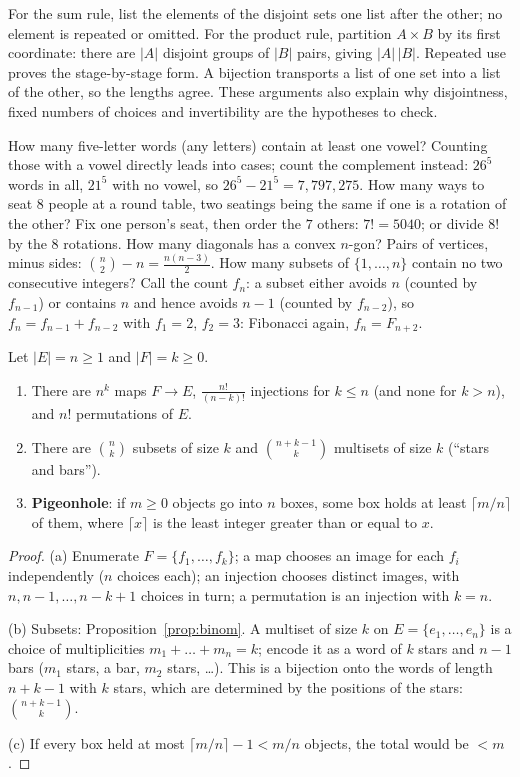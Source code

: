 For the sum rule, list the elements of the disjoint sets one list after the other; no element is repeated or omitted. For the product rule, partition $A\times B$ by its first coordinate: there are $|A|$ disjoint groups of $|B|$ pairs, giving $|A|\,|B|$. Repeated use proves the stage-by-stage form. A bijection transports a list of one set into a list of the other, so the lengths agree. These arguments also explain why disjointness, fixed numbers of choices and invertibility are the hypotheses to check.

\begin{examplex}
How many five-letter words (any letters) contain at least one vowel? Counting those with a vowel directly leads into cases; count the complement instead: $26^5$ words in all, $21^5$ with no vowel, so $26^5-21^5=7{,}797{,}275$. How many ways to seat $8$ people at a round table, two seatings being the same if one is a rotation of the other? Fix one person's seat, then order the $7$ others: $7!=5040$; or divide $8!$ by the $8$ rotations. How many diagonals has a convex $n$-gon? Pairs of vertices, minus sides: $\binom n2-n=\frac{n(n-3)}2$. How many subsets of $\{1,\dots,n\}$ contain no two consecutive integers? Call the count $f_n$: a subset either avoids $n$ (counted by $f_{n-1}$) or contains $n$ and hence avoids $n-1$ (counted by $f_{n-2}$), so $f_n=f_{n-1}+f_{n-2}$ with $f_1=2$, $f_2=3$: Fibonacci again, $f_n=F_{n+2}$.
\end{examplex}

\begin{proposition}\label{prop:counts}
Let $|E|=n\ge1$ and $|F|=k\ge0$.
\begin{enumerate}[label=(\alph*)]
\item There are $n^k$ maps $F\to E$, $\frac{n!}{(n-k)!}$ injections for $k\le n$ (and none for $k>n$), and $n!$ permutations of $E$.
\item There are $\binom nk$ subsets of size $k$ and $\binom{n+k-1}k$ multisets of size $k$ (``stars and bars'').
\item \textbf{Pigeonhole}: if $m\ge0$ objects go into $n$ boxes, some box holds at least $\lceil m/n\rceil$ of them, where $\lceil x\rceil$ is the least integer greater than or equal to $x$.
\end{enumerate}
\end{proposition}
\begin{proof}
(a) Enumerate $F=\{f_1,\dots,f_k\}$; a map chooses an image for each $f_i$ independently ($n$ choices each); an injection chooses distinct images, with $n,n-1,\dots,n-k+1$ choices in turn; a permutation is an injection with $k=n$.

(b) Subsets: Proposition~\ref{prop:binom}. A multiset of size $k$ on $E=\{e_1,\dots,e_n\}$ is a choice of multiplicities $m_1+\dots+m_n=k$; encode it as a word of $k$ stars and $n-1$ bars ($m_1$ stars, a bar, $m_2$ stars, \dots). This is a bijection onto the words of length $n+k-1$ with $k$ stars, which are determined by the positions of the stars: $\binom{n+k-1}k$.

(c) If every box held at most $\lceil m/n\rceil-1<m/n$ objects, the total would be $<m$.
\end{proof}

